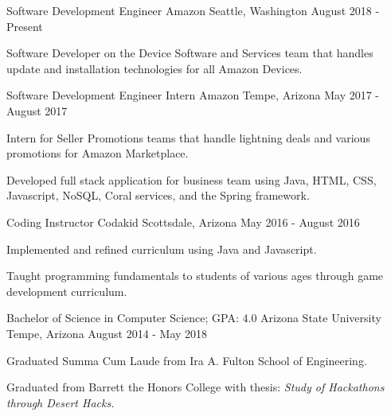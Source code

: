 \documentclass[
    changecolor={96, 52, 177},
]{peter-resume}
\begin{document}
\pagestyle{empty} %

\cventry
  {Software Development Engineer}
  {Amazon}
  {Seattle, Washington}
  {August 2018 - Present}
  {
    \begin{cvitems}
      \item {Software Developer on the Device Software and Services team that handles update and installation technologies for all Amazon Devices.}
    \end{cvitems}
  }
\cventry
  {Software Development Engineer Intern}
  {Amazon}
  {Tempe, Arizona}
  {May 2017 - August 2017}
  {
    \begin{cvitems}
      \item {Intern for Seller Promotions teams that handle lightning deals and various promotions for Amazon Marketplace.}
      \item {Developed full stack application for business team using Java, HTML, CSS, Javascript, NoSQL, Coral services, and the Spring framework.}
    \end{cvitems}
  }
\cventry
  {Coding Instructor}
  {Codakid}
  {Scottsdale, Arizona}
  {May 2016 - August 2016}
  {
    \begin{cvitems}
      \item {Implemented and refined curriculum using Java and Javascript.}
      \item {Taught programming fundamentals to students of various ages through game development curriculum.}
    \end{cvitems}
  }

\cventry
  {Bachelor of Science in Computer Science; GPA: 4.0}
  {Arizona State University}
  {Tempe, Arizona}
  {August 2014 - May 2018}
  {
    \begin{cvitems}
      \item {Graduated Summa Cum Laude from Ira A. Fulton School of Engineering.}
      \item {Graduated from Barrett the Honors College with thesis: \it{Study of Hackathons through Desert Hacks}.}
    \end{cvitems}
  }
\end{document}
